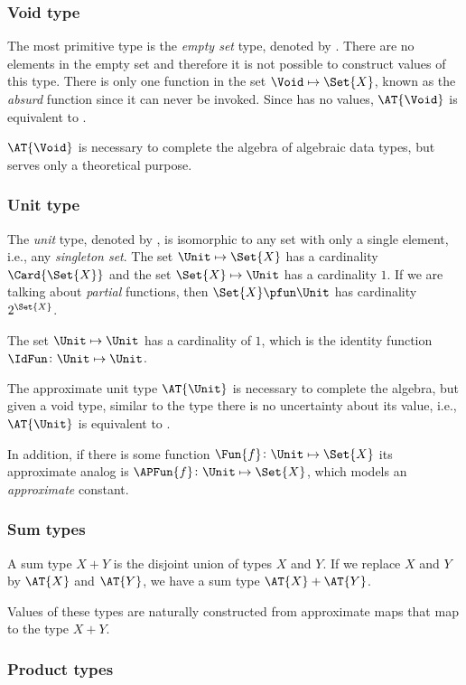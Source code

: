 \documentclass[ ../main.tex]{subfiles}
\begin{document}
\subsubsection{Void type}
The most primitive type is the \emph{empty set} type, denoted by \Void.
There are no elements in the empty set and therefore it is not possible to construct values of this type.
There is only one function in the set $\Void \mapsto \Set{X}$, known as the \emph{absurd} function since it can never be invoked.
Since \Void has no values, $\AT{\Void}$ is equivalent to \Void.

$\AT{\Void}$ is necessary to complete the algebra of algebraic data types, but serves only a theoretical purpose.

\subsubsection{Unit type}
The \emph{unit} type, denoted by \Unit, is isomorphic to any set with only a single element, i.e., any \emph{singleton set}.
The set $\Unit \mapsto \Set{X}$ has a cardinality $\Card{\Set{X}}$ and the set $\Set{X} \mapsto \Unit$ has a cardinality $1$.
If we are talking about \emph{partial} functions, then $\Set{X} \pfun \Unit$ has cardinality $2^{\Set{X}}$.

The set $\Unit \mapsto \Unit$ has a cardinality of $1$, which is the identity function $\IdFun \colon \Unit \mapsto \Unit$.

The approximate unit type $\AT{\Unit}$ is necessary to complete the algebra, but given a void \Unit type, similar to the \Void type there is no uncertainty about its value, i.e., $\AT{\Unit}$ is equivalent to \Unit.

In addition, if there is some function $\Fun{f} \colon \Unit \mapsto \Set{X}$ its approximate analog is $\APFun{f} \colon \Unit \mapsto \Set{X}$, which models an \emph{approximate} constant.

\subsubsection{Sum types}

A sum type $X + Y$ is the disjoint union of types $X$ and $Y$.
If we replace $X$ and $Y$ by $\AT{X}$ and $\AT{Y}$, we have a sum type $\AT{X} + \AT{Y}$.

Values of these types are naturally constructed from approximate maps that map to the type $X+Y$.

\subsubsection{Product types}
\end{document}
